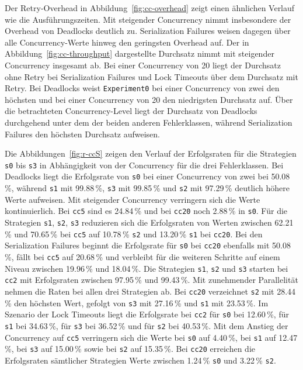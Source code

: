 Der Retry-Overhead in Abbildung~\ref{fig:cc-overhead} zeigt einen ähnlichen Verlauf wie die Ausführungszeiten.
Mit steigender Concurrency nimmt insbesondere der Overhead von Deadlocks deutlich zu.
Serialization Failures weisen dagegen über alle Concurrency-Werte hinweg den geringsten Overhead auf.
Der in Abbildung~\ref{fig:cc-throughput} dargestellte Durchsatz nimmt mit steigender Concurrency insgesamt ab.
Bei einer Concurrency von 20 liegt der Durchsatz ohne Retry bei Serialization Failures und Lock Timeouts über dem
Durchsatz mit Retry.
Bei Deadlocks weist \texttt{Experiment0} bei einer Concurrency von zwei den höchsten und bei einer Concurrency von 20
den niedrigsten Durchsatz auf.
Über die betrachteten Concurrency-Level liegt der Durchsatz von Deadlocks durchgehend unter dem der beiden anderen
Fehlerklassen, während Serialization Failures den höchsten Durchsatz aufweisen.



Die Abbildungen~\ref{fig:r-ccS} zeigen den Verlauf der Erfolgsraten für die Strategien \texttt{s0} bis \texttt{s3}
in Abhängigkeit von der Concurrency für die drei Fehlerklassen.
Bei Deadlocks liegt die Erfolgsrate von \texttt{s0} bei einer Concurrency von zwei bei 50.08\,\%, während \texttt{s1} mit
99.88\,\%, \texttt{s3} mit 99.85\,\% und \texttt{s2} mit 97.29\,\% deutlich höhere Werte aufweisen.
Mit steigender Concurrency verringern sich die Werte kontinuierlich.
Bei \texttt{cc5} sind es 24.84\,\% und bei \texttt{cc20} noch 2.88\,\% in \texttt{s0}.
Für die Strategien \texttt{s1}, \texttt{s2}, \texttt{s3} reduzieren sich die Erfolgsraten von Werten zwischen 62.21\,\%
und 70.65\,\% bei \texttt{cc5} auf 10.78\,\% \texttt{s2} und 13.20\,\% \texttt{s1} bei \texttt{cc20}.
Bei den Serialization Failures beginnt die Erfolgsrate für \texttt{s0} bei \texttt{cc20} ebenfalls mit
50.08\,\%, fällt bei \texttt{cc5} auf 20.68\,\% und verbleibt für die weiteren Schritte auf einem Niveau
zwischen 19.96\,\% und 18.04\,\%.
Die Strategien \texttt{s1}, \texttt{s2} und \texttt{s3} starten bei \texttt{cc2} mit Erfolgsraten zwischen 97.95\,\%
und 99.43\,\%.
Mit zunehmender Parallelität nehmen die Raten bei allen drei Strategien ab.
Bei \texttt{cc20} verzeichnet \texttt{s2} mit 28.44\,\% den höchsten Wert, gefolgt von \texttt{s3} mit 27.16\,\% und
\texttt{s1} mit 23.53\,\%.
Im Szenario der Lock Timeouts liegt die Erfolgsrate bei \texttt{cc2} für \texttt{s0} bei 12.60\,\%, für
\texttt{s1} bei 34.63\,\%, für \texttt{s3} bei 36.52\,\% und für \texttt{s2} bei 40.53\,\%.
Mit dem Anstieg der Concurrency auf \texttt{cc5} verringern sich die Werte bei \texttt{s0} auf 4.40\,\%, bei
\texttt{s1} auf 12.47\,\%, bei \texttt{s3} auf 15.00\,\% sowie bei \texttt{s2} auf 15.35\,\%.
Bei \texttt{cc20} erreichen die Erfolgsraten sämtlicher Strategien Werte zwischen 1.24\,\% \texttt{s0} und 3.22\,\%
\texttt{s2}.

